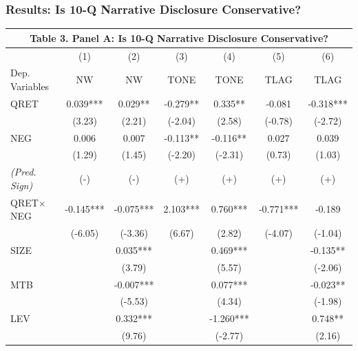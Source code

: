 \documentclass{beamer}
\begin{document}
\begin{frame}
\frametitle{Results: Is 10-Q Narrative Disclosure Conservative?}

\begin{table}[H] \label{T3PA}
	\begin{center} \tiny
		\begin{tabular}{lcccccc}
			\multicolumn{7}{c}{\textbf{Table 3. Panel A: Is 10-Q Narrative Disclosure Conservative?}} \\
			\toprule
			\toprule
			& (1) & (2) & (3) & (4) & (5) & (6) \\
			Dep. Variables & NW & NW & TONE & TONE & TLAG & TLAG \\
			\midrule

			QRET & 0.039*** & 0.029** & -0.279** & 0.335** & -0.081 & -0.318*** \\
			& (3.23) & (2.21) & (-2.04) & (2.58) & (-0.78) & (-2.72) \\
			NEG & 0.006 & 0.007 & -0.113** & -0.116** & 0.027 & 0.039 \\
			& (1.29) & (1.45) & (-2.20) & (-2.31) & (0.73) & (1.03) \\
			 \textit{(Pred. Sign)} & (-) & (-) & (+) & (+) & (+) & (+) \\
			 QRET$\times$NEG & -0.145*** & -0.075*** & 2.103*** & 0.760*** & -0.771*** & -0.189 \\
			 & (-6.05) & (-3.36) & (6.67) & (2.82) & (-4.07) & (-1.04) \\
			SIZE &   & 0.035*** &   & 0.469*** &   & -0.135** \\
			&   & (3.79) &   & (5.57) &   & (-2.06) \\
			MTB &   & -0.007*** &   & 0.077*** &   & -0.023** \\
			&   & (-5.53) &   & (4.34) &   & (-1.98) \\
			LEV &   & 0.332*** &   & -1.260*** &   & 0.748** \\
			&   & (9.76) &   & (-2.77) &   & (2.16) \\




\end{tabular}
\end{center}
\end{table}
\end{frame}
\end{document}
